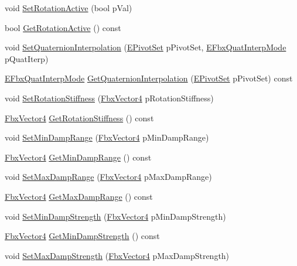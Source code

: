 \begin{DoxyCompactItemize}
\item 
void \hyperlink{class_fbx_node_aee328b4f0ff64c2e80dc7a0840c51f80}{Set\+Rotation\+Active} (bool p\+Val)
\item 
bool \hyperlink{class_fbx_node_a4060333733b1f6af34bda51806569f85}{Get\+Rotation\+Active} () const
\item 
void \hyperlink{class_fbx_node_a32def733f7dfd89092f914be749741b8}{Set\+Quaternion\+Interpolation} (\hyperlink{class_fbx_node_ae62b7311ac4727654cdf1ebd5cbf7343}{E\+Pivot\+Set} p\+Pivot\+Set, \hyperlink{fbxmath_8h_a9c7a0dfb52c83256d4a92c5c6d1be72a}{E\+Fbx\+Quat\+Interp\+Mode} p\+Quat\+Iterp)
\item 
\hyperlink{fbxmath_8h_a9c7a0dfb52c83256d4a92c5c6d1be72a}{E\+Fbx\+Quat\+Interp\+Mode} \hyperlink{class_fbx_node_a58c6ad6cb9f2ee26f4ba917e0d7ff714}{Get\+Quaternion\+Interpolation} (\hyperlink{class_fbx_node_ae62b7311ac4727654cdf1ebd5cbf7343}{E\+Pivot\+Set} p\+Pivot\+Set) const
\item 
void \hyperlink{class_fbx_node_aebaed5a99d859e714aed823b221860ee}{Set\+Rotation\+Stiffness} (\hyperlink{class_fbx_vector4}{Fbx\+Vector4} p\+Rotation\+Stiffness)
\item 
\hyperlink{class_fbx_vector4}{Fbx\+Vector4} \hyperlink{class_fbx_node_a6bea622a74023ebdef08a44a045e6151}{Get\+Rotation\+Stiffness} () const
\item 
void \hyperlink{class_fbx_node_a5d250af20153c92335a0d462581b07e2}{Set\+Min\+Damp\+Range} (\hyperlink{class_fbx_vector4}{Fbx\+Vector4} p\+Min\+Damp\+Range)
\item 
\hyperlink{class_fbx_vector4}{Fbx\+Vector4} \hyperlink{class_fbx_node_a98ef65828cb2e5e6ae17ba3a61ed09b2}{Get\+Min\+Damp\+Range} () const
\item 
void \hyperlink{class_fbx_node_afa13e04c7407a2aefc0cde6706a39541}{Set\+Max\+Damp\+Range} (\hyperlink{class_fbx_vector4}{Fbx\+Vector4} p\+Max\+Damp\+Range)
\item 
\hyperlink{class_fbx_vector4}{Fbx\+Vector4} \hyperlink{class_fbx_node_ada06a2a32c895f850c45e86d8478fe54}{Get\+Max\+Damp\+Range} () const
\item 
void \hyperlink{class_fbx_node_a5723a65d1841667ced97cbdbb106c740}{Set\+Min\+Damp\+Strength} (\hyperlink{class_fbx_vector4}{Fbx\+Vector4} p\+Min\+Damp\+Strength)
\item 
\hyperlink{class_fbx_vector4}{Fbx\+Vector4} \hyperlink{class_fbx_node_a162d1547949a84fa51a0a204c49ef38c}{Get\+Min\+Damp\+Strength} () const
\item 
void \hyperlink{class_fbx_node_a54723e8134112d132a69e98fcc418e5c}{Set\+Max\+Damp\+Strength} (\hyperlink{class_fbx_vector4}{Fbx\+Vector4} p\+Max\+Damp\+Strength)

\end{DoxyCompactItemize}
